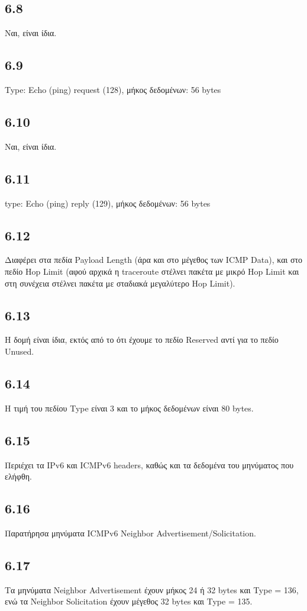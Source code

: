 		\subsection*{6.8}
			Ναι, είναι ίδια.

		\subsection*{6.9}
			Type: Echo (ping) request (128), μήκος δεδομένων: 56 bytes

		\subsection*{6.10}
			Ναι, είναι ίδια.

		\subsection*{6.11}
			type: Echo (ping) reply (129), μήκος δεδομένων: 56 bytes

		\subsection*{6.12}
			Διαφέρει στα πεδία Payload Length (άρα και στο μέγεθος των ICMP Data), και στο πεδίο Hop Limit (αφού αρχικά η traceroute στέλνει πακέτα με μικρό Hop Limit και στη συνέχεια στέλνει πακέτα με σταδιακά μεγαλύτερο Hop Limit).

		\subsection*{6.13}
			Η δομή είναι ίδια, εκτός από το ότι έχουμε το πεδίο Reserved αντί για το πεδίο Unused.

		\subsection*{6.14}
			Η τιμή του πεδίου Type είναι 3 και το μήκος δεδομένων είναι 80 bytes.

		\subsection*{6.15}
			Περιέχει τα IPv6 και ICMPv6 headers, καθώς και τα δεδομένα του μηνύματος που ελήφθη.

		\subsection*{6.16}
			Παρατήρησα μηνύματα ICMPv6 Neighbor Advertisement/Solicitation.

		\subsection*{6.17}
			 Τα μηνύματα Neighbor Advertisement έχουν μήκος 24 ή 32 bytes και Type = 136, ενώ τα Neighbor Solicitation έχουν μέγεθος 32 bytes και Type = 135.
